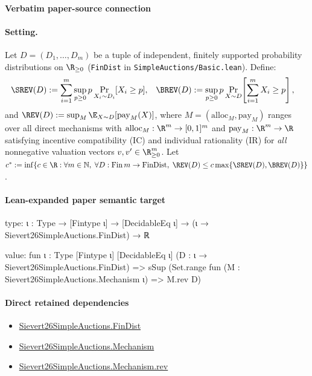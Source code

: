 \documentclass[10pt]{article}
\begin{document}
\paragraph{Verbatim paper-source connection}
\begin{ReviewVerbatim}
\paragraph{Setting.}
Let $D = (D_1, \dots, D_m)$ be a tuple of independent, finitely supported probability distributions on $\R_{\ge 0}$ (\texttt{FinDist} in \texttt{SimpleAuctions/Basic.lean}). Define:
\begin{align*}
  \SREV(D) &:= \sum_{i=1}^m \sup_{p \ge 0} p \Pr_{X_i \sim D_i}[X_i \ge p], &
  \BREV(D) &:= \sup_{p \ge 0} p \Pr_{X \sim D}\!\left[\sum_{i=1}^m X_i \ge p\right],
\end{align*}
and $\REV(D) := \sup_{M} \E_{X \sim D}[\mathrm{pay}_M(X)]$, where $M = (\mathrm{alloc}_M, \mathrm{pay}_M)$ ranges over all direct mechanisms with $\mathrm{alloc}_M : \R^m \to [0,1]^m$ and $\mathrm{pay}_M : \R^m \to \R$ satisfying incentive compatibility (IC) and individual rationality (IR) for \emph{all} nonnegative valuation vectors $v, v' \in \R_{\ge 0}^m$. Let $c^* := \inf\{c \in \R : \forall m \in \mathbb{N},\; \forall D : \mathrm{Fin}\,m \to \mathrm{FinDist},\; \REV(D) \le c \max\{\SREV(D),\BREV(D)\}\}$.
\end{ReviewVerbatim}



\paragraph{Lean-expanded paper semantic target}
\begin{ReviewVerbatim}
type:
{ι : Type} → [Fintype ι] → [DecidableEq ι] → (ι → Sievert26SimpleAuctions.FinDist) → ℝ

value:
fun {ι : Type} [Fintype ι] [DecidableEq ι] (D : ι → Sievert26SimpleAuctions.FinDist) =>
  sSup (Set.range fun (M : Sievert26SimpleAuctions.Mechanism ι) => M.rev D)
\end{ReviewVerbatim}

\paragraph{Direct retained dependencies}
\begin{itemize}\raggedright
\item \hyperlink{paper-prerequisite-5b39ea21863ce14e}{Sievert26\allowbreak{}Simple\allowbreak{}Auctions.\allowbreak{}Fin\allowbreak{}Dist}
\item \hyperlink{paper-prerequisite-b1d558d0810cbb0e}{Sievert26\allowbreak{}Simple\allowbreak{}Auctions.\allowbreak{}Mechanism}
\item \hyperlink{governing-declaration-8a7d9cf1128641b7}{Sievert26\allowbreak{}Simple\allowbreak{}Auctions.\allowbreak{}Mechanism.\allowbreak{}rev}
\end{itemize}
\end{document}
